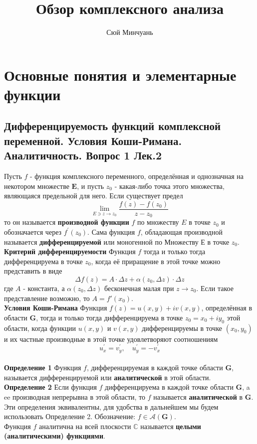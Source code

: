 \documentclass{article}
\begin{document}
\author{Сюй Минчуань}
\title{Обзор комплексного анализа}
\maketitle
\tableofcontents
\newpage
\section{Основные понятия и элементарные функции}
\subsection{Дифференцируемость функций комплексной переменной. Условия Коши-Римана. Аналитичность. Вопрос 1 Лек.2}
	Пусть $ f $ - функция комплексного переменного, определённая и однозначная на некотором множестве $\mathbf{E}$, и пусть ${z}_{0}$ - какая-либо точка этого множества, являющаяся предельной для него.
	Если существует предел
	\begin{equation}
	\lim _{E \ni z \rightarrow z_{0}} \frac{f(z)-f\left(z_{0}\right)}{z-z_{0}}
	\end{equation}
	то он называется \textbf{производной функции} $ f $ по множеству $ E $ в точке $ z_{0} $ и обозначается через $ f^{\prime}\left(z_{0}\right) $. Сама функция $ f$, обладающая производной называется \textbf{дифференцируемой} или моногенной по Множеству $Е$ в точке $z_{0}$.\\
	\textbf{Критерий дифференцируемости} Функция $f$ тогда и только тогда дифференцируема в точке $z_{0}$, когда её приращение в этой точке можно представить в виде
	\begin{equation}
	\Delta f(z)=A\cdot \Delta z+\alpha({z}_{0},\Delta z)\cdot \Delta z
	\end{equation}
	где $A$ - константа, а $\alpha({z}_{0},\Delta z)$ бесконечная малая при $z\rightarrow {z}_{0}$. Если такое представление возможно, то $A=f'({x}_{0})$.\\
	\textbf{Условия Коши-Римана} Функция $ f(z)=u(x, y)+i v(x, y)$,  определённая в области $ \mathbf{G}$,  тогда и только тогда дифференцируема в точке $ z_{0}=x_{0}+iy_{0}$ этой области, когда функции $ u(x, y) $ и $ v(x, y) $ дифференцируемы в точке $ \left(x_{0}, y_{0}\right) $ и их частные производные в этой точке удовлетворяют соотношениям
	\begin{equation}
	u_{x}^{\prime}=v_{y}^{\prime}, \quad u_{y}^{\prime}=-v_{x}^{\prime}
	\end{equation}
	\\ 
	\textbf{Определение 1} Функция $ f$, дифференцируемая в каждой точке области $\mathbf{G}$, называется дифференцируемой или \textbf{аналитической} в этой области.\\
	\textbf{Определение 2} Если функция $ f $ дифференцируема в каждой точке области $\mathbf{G}$, a ee производная непрерывна в этой области, то $ f $ называется \textbf{аналитической} в $\mathbf{G}$.\\
	Эти определения эквивалентны, для удобства в дальнейшем мы будем использовать Определение 2. Обозначение: $f\in \mathcal{A}(\mathbf{G})$.\\
	Функция $f$ аналитична на всей плоскости $\mathbb{C}$ называется \textbf{целыми (аналитическими) функциями}.\\
\end{document}
